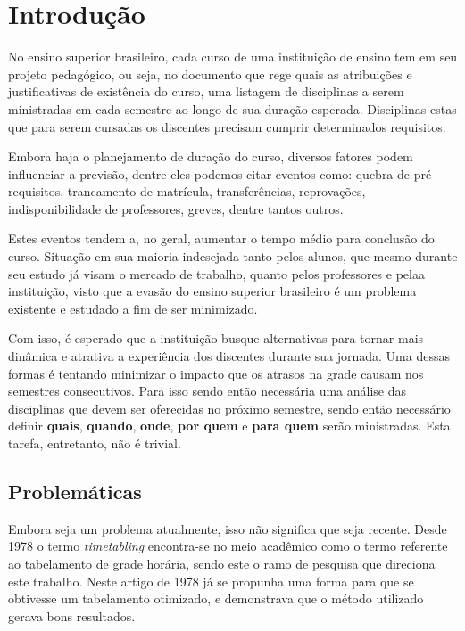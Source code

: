 \chapter{Introdução} \label{chap:introducao}             %

No ensino superior brasileiro, cada curso de uma instituição de ensino tem em seu projeto pedagógico, ou seja, no documento que rege quais as atribuições e justificativas de existência do curso, uma listagem de disciplinas a serem ministradas em cada semestre ao longo de sua duração esperada. Disciplinas estas que para serem cursadas os discentes precisam cumprir determinados requisitos.

Embora haja o planejamento de duração do curso, diversos fatores podem influenciar a previsão, dentre eles podemos citar eventos como: quebra de pré-requisitos, trancamento de matrícula, transferências, reprovações, indisponibilidade de professores, greves, dentre tantos outros.

Estes eventos tendem a, no geral, aumentar o tempo médio para conclusão do curso. Situação em sua maioria indesejada tanto pelos alunos, que mesmo durante seu estudo já visam o mercado de trabalho, quanto pelos professores e pelaa instituição, visto que a evasão do ensino superior brasileiro é um problema existente e estudado a fim de ser minimizado.

Com isso, é esperado que a instituição busque alternativas para tornar mais dinâmica e atrativa a experiência dos discentes durante sua jornada. Uma dessas formas é tentando minimizar o impacto que os atrasos na grade causam nos semestres consecutivos. Para isso sendo então necessária uma análise das disciplinas que devem ser oferecidas no próximo semestre, sendo então necessário definir \textbf{quais}, \textbf{quando}, \textbf{onde}, \textbf{por quem} e \textbf{para quem} serão ministradas. Esta tarefa, entretanto, não é trivial.

\section{Problemáticas} \label{sec:Problemáticas}        %

Embora seja um problema atualmente, isso não significa que seja recente. Desde 1978 \cite{BARHAM1978} o termo \textit{timetabling} encontra-se no meio acadêmico como o termo referente ao tabelamento de grade horária, sendo este o ramo de pesquisa que direciona este trabalho. Neste artigo de 1978 já se propunha uma forma para que se obtivesse um tabelamento otimizado, e demonstrava que o método utilizado gerava bons resultados.


